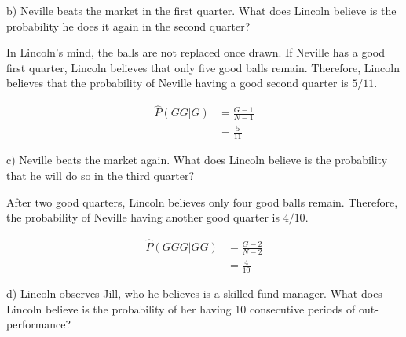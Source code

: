 \documentclass[
  letterpaper,
  DIV=11,
  numbers=noendperiod]{scrreprt}
\begin{document}
b) Neville beats the market in the first quarter. What does Lincoln
believe is the probability he does it again in the second quarter?

\begin{tcolorbox}[enhanced jigsaw, title=\textcolor{quarto-callout-tip-color}{\faLightbulb}\hspace{0.5em}{Answer}, toprule=.15mm, colback=white, breakable, titlerule=0mm, colframe=quarto-callout-tip-color-frame, coltitle=black, opacityback=0, rightrule=.15mm, colbacktitle=quarto-callout-tip-color!10!white, bottomtitle=1mm, opacitybacktitle=0.6, arc=.35mm, bottomrule=.15mm, toptitle=1mm, leftrule=.75mm, left=2mm]

In Lincoln's mind, the balls are not replaced once drawn. If Neville has
a good first quarter, Lincoln believes that only five good balls remain.
Therefore, Lincoln believes that the probability of Neville having a
good second quarter is \(5/11\).

\begin{align*}
\hat P(GG|G)&=\frac{G-1}{N-1} \\
&=\frac{5}{11}
\end{align*}

\end{tcolorbox}

c) Neville beats the market again. What does Lincoln believe is the
probability that he will do so in the third quarter?

\begin{tcolorbox}[enhanced jigsaw, title=\textcolor{quarto-callout-tip-color}{\faLightbulb}\hspace{0.5em}{Answer}, toprule=.15mm, colback=white, breakable, titlerule=0mm, colframe=quarto-callout-tip-color-frame, coltitle=black, opacityback=0, rightrule=.15mm, colbacktitle=quarto-callout-tip-color!10!white, bottomtitle=1mm, opacitybacktitle=0.6, arc=.35mm, bottomrule=.15mm, toptitle=1mm, leftrule=.75mm, left=2mm]

After two good quarters, Lincoln believes only four good balls remain.
Therefore, the probability of Neville having another good quarter is
\(4/10\).

\begin{align*}
\hat P(GGG|GG)&=\frac{G-2}{N-2} \\
&=\frac{4}{10}
\end{align*}

\end{tcolorbox}

d) Lincoln observes Jill, who he believes is a skilled fund manager.
What does Lincoln believe is the probability of her having 10
consecutive periods of out-performance?
\end{document}
